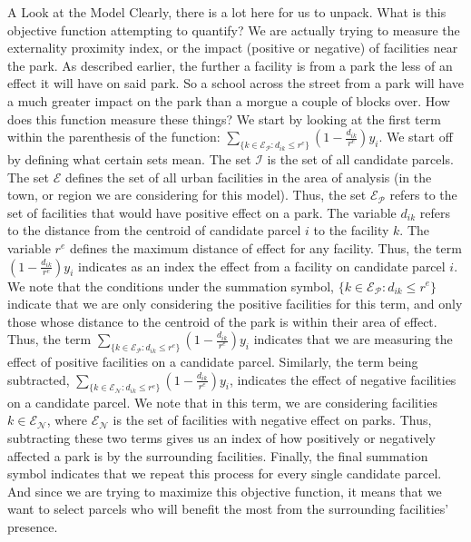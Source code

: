 \documentclass[12pt]{pom_thesis}
\theoremstyle{definition}
\begin{document}
\begin{chapter}{A Look at the Model}
Clearly, there is a lot here for us to unpack. What is this objective function attempting to quantify? We are actually trying to measure the externality proximity index, or the impact (positive or negative) of facilities near the park. As described earlier, the further a facility is from a park the less of an effect it will have on said park. So a school across the street from a park will have a much greater impact on the park than a morgue a couple of blocks over. How does this function measure these things? We start by looking at the first term within the parenthesis of the function: $\sum_{\{k \in \mathcal{E_P}: d_{ik} \leq r^e  \}} \left( 1-\frac{d_{ik}}{r^e} \right) y_i$. We start off by defining what certain sets mean. The set $\mathcal{I}$ is the set of all candidate parcels. The set $\mathcal{E}$ defines the set of all urban facilities in the area of analysis (in the town, or region we are considering for this model). Thus, the set $\mathcal{E_P}$ refers to the set of facilities that would have positive effect on a park. The variable $d_{ik}$ refers to the distance from the centroid of candidate parcel $i$ to the facility $k$. The variable $r^e$ defines the maximum distance of effect for any facility. Thus, the term $ \left( 1-\frac{d_{ik}}{r^e} \right) y_i$ indicates as an index the effect from a facility on candidate parcel $i$. We note that the conditions under the summation symbol, $\{k \in \mathcal{E_P}: d_{ik} \leq r^e  \}$ indicate that we are only considering the positive facilities for this term, and only those whose distance to the centroid of the park is within their area of effect. Thus, the term $\sum_{\{k \in \mathcal{E_P}: d_{ik} \leq r^e  \}} \left( 1-\frac{d_{ik}}{r^e} \right) y_i$ indicates that we are measuring the effect of positive facilities on a candidate parcel. Similarly, the term being subtracted, $ \sum_{\{k \in \mathcal{E_N}: d_{ik} \leq r^e  \}} \left( 1-\frac{d_{ik}}{r^e} \right) y_i  $, indicates the effect of negative facilities on a candidate parcel. We note that in this term, we are considering facilities $k \in \mathcal{E_N}$, where $\mathcal{E_N}$ is the set of facilities with negative effect on parks. Thus, subtracting these two terms gives us an index of how positively or negatively affected a park is by the surrounding facilities. Finally, the final summation symbol indicates that we repeat this process for every single candidate parcel. And since we are trying to maximize this objective function, it means that we want to select parcels who will benefit the most from the surrounding facilities' presence. \\


\end{chapter}
\end{document}
